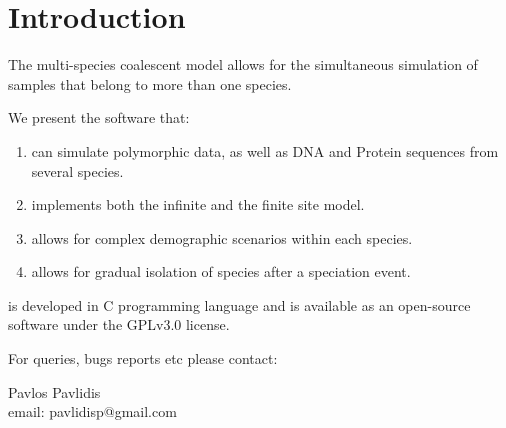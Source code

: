 \chapter*{Introduction}

\thispagestyle{empty}

The multi-species coalescent model allows for the simultaneous simulation of samples that belong to more than one species. 

We present the software \comus that:

\begin{enumerate}
\item can simulate polymorphic data, as well as DNA and Protein sequences from several species.
\item implements both the infinite and the finite site model.
\item allows for complex demographic scenarios within each species.
\item allows for gradual isolation of species after a speciation event. 
\end{enumerate}

\comus is developed in C programming language and is available as an open-source software under the GPLv3.0 license. 

For queries, bugs reports etc please contact:

Pavlos Pavlidis\\
email: pavlidisp@gmail.com\\


